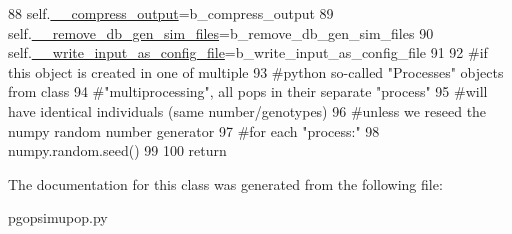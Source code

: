\begin{DoxyCode}
88         self.\hyperlink{classnegui_1_1pgopsimupop_1_1PGOpSimuPop_acccf36393e66057c8026cba0557d3fb8}{\_\_compress\_output}=b\_compress\_output
89         self.\hyperlink{classnegui_1_1pgopsimupop_1_1PGOpSimuPop_a5a64b272404e6113dd1c7ba70235c366}{\_\_remove\_db\_gen\_sim\_files}=b\_remove\_db\_gen\_sim\_files
90         self.\hyperlink{classnegui_1_1pgopsimupop_1_1PGOpSimuPop_a9a27655cf00df0e11603e221c314c0a9}{\_\_write\_input\_as\_config\_file}=b\_write\_input\_as\_config\_file
91 
92         \textcolor{comment}{#if this object is created in one of multiple}
93         \textcolor{comment}{#python so-called "Processes" objects from class}
94         \textcolor{comment}{#"multiprocessing", all pops in their separate "process"}
95         \textcolor{comment}{#will have identical individuals (same number/genotypes) }
96         \textcolor{comment}{#unless we reseed the numpy random number generator }
97         \textcolor{comment}{#for each "process:"}
98         numpy.random.seed()
99         
100         \textcolor{keywordflow}{return}
\end{DoxyCode}


The documentation for this class was generated from the following file\+:\begin{DoxyCompactItemize}
\item 
pgopsimupop.\+py\end{DoxyCompactItemize}
